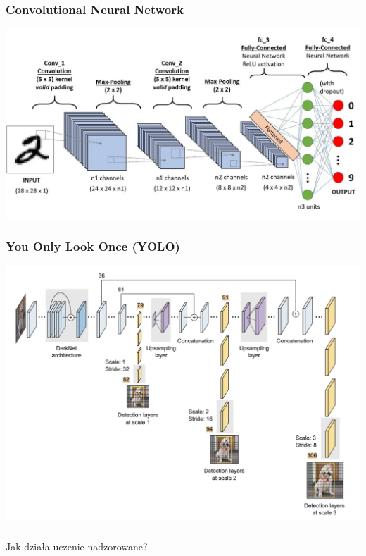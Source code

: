 \documentclass[smaller]{beamer}
\begin{document}

\begin{frame}
\frametitle{Convolutional Neural Network}
\includegraphics[width=\textwidth,height=0.8\textheight,keepaspectratio]{../manifest/deep-learning.png}
\end{frame}


\begin{frame}
\frametitle{You Only Look Once (YOLO)}
\includegraphics[width=\textwidth,height=0.8\textheight,keepaspectratio]{../manifest/yolo.png}
\end{frame}


\begin{frame}
\frametitle{}

\begin{center}
\Huge Jak działa uczenie nadzorowane?
\end{center}

\end{frame}
\end{document}

